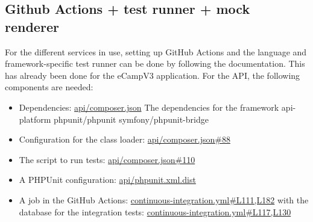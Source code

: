 \documentclass[conference]{IEEEtran}
\begin{document}
\subsection{Github Actions + test runner + mock renderer}
For the different services in use, setting up GitHub Actions and the language and framework-specific test runner can be done by following the documentation.
This has already been done for the eCampV3 application.\newline
For the API, the following components are needed:
\begin{itemize}
	\item Dependencies: \href{https://github.com/ecamp/ecamp3/blob/7a1cf92e3eee27b0b942fcd87bd8ce5c221089b7/api/composer.json}{api/composer.json}
	      \subitem The dependencies for the framework api-platform
	      \subitem phpunit/phpunit
	      \subitem symfony/phpunit-bridge
	\item Configuration for the class loader: \href{https://github.com/ecamp/ecamp3/blob/7a1cf92e3eee27b0b942fcd87bd8ce5c221089b7/api/composer.json\#L88}{api/composer.json\#88}
	\item The script to run tests: \href{https://github.com/ecamp/ecamp3/blob/7a1cf92e3eee27b0b942fcd87bd8ce5c221089b7/api/composer.json\#L110}{api/composer.json\#110}
	\item A PHPUnit configuration: \href{https://github.com/ecamp/ecamp3/blob/7a1cf92e3eee27b0b942fcd87bd8ce5c221089b7/api/phpunit.xml.dist}{api/phpunit.xml.dist}
	\item A job in the GitHub Actions: \href{https://github.com/ecamp/ecamp3/blob/7a1cf92e3eee27b0b942fcd87bd8ce5c221089b7/.github/workflows/continuous-integration.yml#L111,L182}{continuous-integration.yml\#L111,L182}
	      \subitem with the database for the integration tests: \href{https://github.com/ecamp/ecamp3/blob/7a1cf92e3eee27b0b942fcd87bd8ce5c221089b7/.github/workflows/continuous-integration.yml#L117,L130}{continuous-integration.yml\#L117,L130}
\end{itemize}
\end{document}
